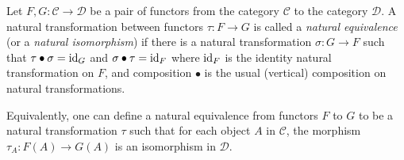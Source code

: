 \documentclass[12pt]{article}
\begin{document}
Let $F,G: \mathcal{C}\to \mathcal{D}$ be a pair of functors from the category $\mathcal{C}$ to the category $\mathcal{D}$.  A natural transformation between functors $\tau : F\to G$ is called a {\em natural equivalence} (or a {\em natural isomorphism}) if there is a natural transformation $\sigma : G\to F$ such that $\tau\bullet \sigma = {\rm id}_G$ and $\sigma\bullet \tau = {\rm id}_F$ where ${\rm id}_F$ is the identity natural transformation on $F$, and composition $\bullet$ is the usual (vertical) composition on natural transformations.

Equivalently, one can define a natural equivalence from functors $F$ to $G$ to be a natural transformation $\tau$ such that for each object $A$ in $\mathcal{C}$, the morphism $\tau_A : F(A)\to G(A)$ is an isomorphism in $\mathcal{D}$.
\end{document}

